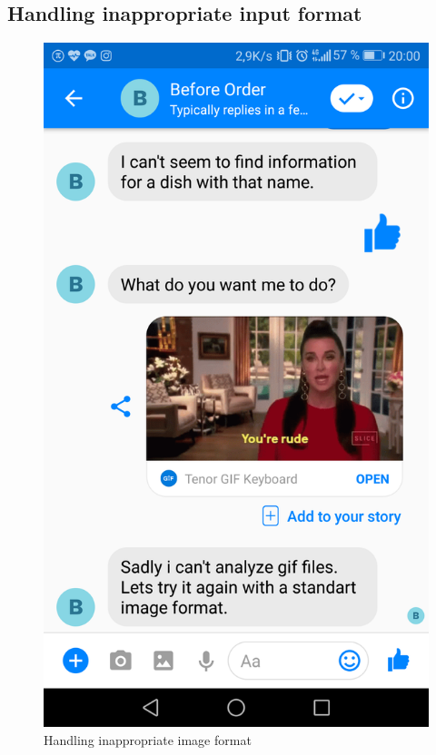 \subsection{Handling inappropriate input format}

\begin{figure}[htbp]
\centerline{\includegraphics[height=\custompicheight]{./pictures/Screenshot_20181125-200053}}
\caption{Handling inappropriate image format}
\label{fig:Before Order_handling_error}
\end{figure}
\FloatBarrier


